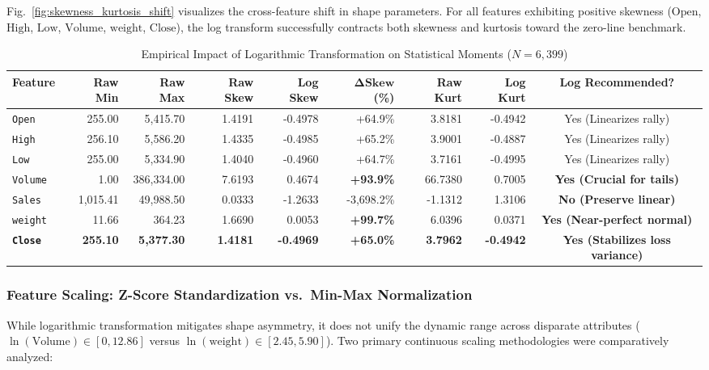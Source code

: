 \documentclass[conference]{IEEEtran}
\begin{document}
Fig.~\ref{fig:skewness_kurtosis_shift} visualizes the cross-feature shift in shape parameters. For all features exhibiting positive skewness ($\text{Open}$, $\text{High}$, $\text{Low}$, $\text{Volume}$, $\text{weight}$, $\text{Close}$), the log transform successfully contracts both skewness and kurtosis toward the zero-line benchmark.

\begin{table}[t]
\caption{Empirical Impact of Logarithmic Transformation on Statistical Moments ($N = 6{,}399$)}
\label{tab:transformation_metrics}
\centering
\small
\begin{tabular}{lrrrrrrrc}
\toprule
\textbf{Feature} & \textbf{Raw Min} & \textbf{Raw Max} & \textbf{Raw Skew} & \textbf{Log Skew}  & $\boldsymbol{\Delta\text{Skew}}$ (\%) & \textbf{Raw Kurt} & \textbf{Log Kurt} & \textbf{Log Recommended?} \\
\midrule
\texttt{Open}   & 255.00   & 5,415.70   & 1.4191  & -0.4978  & +64.9\%    & 3.8181   & -0.4942  & Yes (Linearizes rally) \\
\texttt{High}   & 256.10   & 5,586.20   & 1.4335  & -0.4985  & +65.2\%    & 3.9001   & -0.4887  & Yes (Linearizes rally) \\
\texttt{Low}    & 255.00   & 5,334.90   & 1.4040  & -0.4960  & +64.7\%    & 3.7161   & -0.4995  & Yes (Linearizes rally) \\
\texttt{Volume} & 1.00     & 386,334.00 & 7.6193  & 0.4674   & \textbf{+93.9\%} & 66.7380 & 0.7005 & \textbf{Yes (Crucial for tails)} \\
\texttt{Sales}  & 1,015.41 & 49,988.50  & 0.0333  & -1.2633  & -3,698.2\% & -1.1312  & 1.3106   & \textbf{No (Preserve linear)} \\
\texttt{weight} & 11.66    & 364.23     & 1.6690  & 0.0053   & \textbf{+99.7\%} & 6.0396  & 0.0371 & \textbf{Yes (Near-perfect normal)} \\
\textbf{\texttt{Close}} & \textbf{255.10} & \textbf{5,377.30} & \textbf{1.4181} & \textbf{-0.4969} & \textbf{+65.0\%} & \textbf{3.7962} & \textbf{-0.4942} & \textbf{Yes (Stabilizes loss variance)} \\
\bottomrule
\end{tabular}
\end{table}

\subsubsection{Feature Scaling: Z-Score Standardization vs.\ Min-Max Normalization}
While logarithmic transformation mitigates shape asymmetry, it does not unify the dynamic range across disparate attributes ($\ln(\text{Volume}) \in [0, 12.86]$ versus $\ln(\text{weight}) \in [2.45, 5.90]$). Two primary continuous scaling methodologies were comparatively analyzed:
\end{document}

